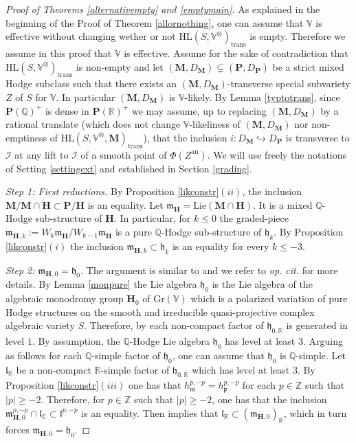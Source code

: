 \documentclass[10pt]{article}
\numberwithin{equation}{subsection}
\theoremstyle{plain}
\theoremstyle{definition}
\theoremstyle{remark}
\newcommand{\lie}{\mathrm{Lie}}
\newcommand{\I}{\mathscr{I}}
\newcommand{\Z}{\mathbb Z}
\newcommand{\Q}{\mathbb Q}
\newcommand{\C}{\mathbb C}
\newcommand{\R}{\mathbb R}
\newcommand{\V}{\mathbb V}
\newcommand{\pp}{\mathbf P}
\newcommand{\mon}{\mathbf H}
\newcommand{\M}{\mathbf M}
\newcommand{\HL}{\mathrm{HL}(S, \V^\otimes)}
\newcommand{\HLM}{\mathrm{HL}(S, \V^\otimes, \M)}
\newcommand{\an}{\mathrm{an}}
\newcommand{\gr}{\mathrm{Gr}}
\newcommand{\para}{\mathfrak{p}}
\newcommand{\mt}{\mathfrak{m}}
\newcommand{\ort}{\mathfrak{h}}
\newcommand{\trans}{\mathrm{trans}}
\newcommand{\ortl}{\mathfrak{l}}
\begin{document}
\begin{proof}[Proof of Theorems \ref{alternativempty} and \ref{emptymain}]
As explained in the beginning of the Proof of Theorem \ref{allornothing}, one can assume that $\V$ is effective without changing wether or not $\HL_\trans$ is empty. Therefore we assume in this proof that $\V$ is effective. Assume for the sake of contradiction that $\HL_\trans$ is non-empty and let $(\M, D_\M) \subsetneq (\pp, D_\pp)$ be a strict mixed Hodge subclass such that there exists an $(\M, D_\M)$-transverse special subvariety $Z$ of $S$ for $\V$. In particular $(\M, D_\M)$ is $\V$-likely. By Lemma \ref{typtotrans}, since $\pp(\Q)^+$ is dense in $\pp(\R)^+$ we may assume, up to replacing $(\M,D_\M)$ by a rational translate (which does not change $\V$-likeliness of $(\M,D_\M)$ nor non-emptiness of $\HLM_\trans$), that the inclusion $i : D_\M \hookrightarrow D_\pp$ is transverse to $\I$ at any lift to $\I$ of a smooth point of $\Phi(Z^\an)$. We will use freely the notations of Setting \ref{settingext} and established in Section \ref{grading}. 

\textit{Step 1: First reductions.} By Proposition \ref{likconstr}$(ii)$, the inclusion $\M/ \M \cap \mon \subset \pp/\mon$ is an equality. Let $\mt_\mon = \lie(\M \cap \mon)$. It is a mixed $\Q$-Hodge sub-structure of $\mon$. In particular, for $k \leqslant 0$ the graded-piece $\mt_{\mon,k} := W_k \mt_\mon/ W_{k-1} \mt_\mon$ is a pure $\Q$-Hodge sub-structure of $\ort_k$. By Proposition \ref{likconstr}$(i)$ the inclusion $\mt_{\mon,k} \subset \ort_k$ is an equality for every $k \leqslant -3$.

\textit{Step 2: $\mt_{\mon,0} = \ort_0$.} The argument is similar to \cite[Proof of Theorem 7.1]{bku} and we refer to \textit{op. cit.} for more details. By Lemma \ref{monpure} the Lie algebra $\ort_0$ is the Lie algebra of the algebraic monodromy group $\mon_0$ of $\gr(\V)$ which is a polarized variation of pure Hodge structures on the smooth and irreducible quasi-projective complex algebraic variety $S$. Therefore, by \cite[Prop. 7.4]{bku} each non-compact factor of $\ort_{0,\R}$ is generated in level $1$. By assumption, the $\Q$-Hodge Lie algebra $\ort_0$ has level at least $3$. Arguing as follows for each $\Q$-simple factor of $\ort_0$, one can assume that $\ort_0$ is $\Q$-simple. Let $\ortl_\R$ be a non-compact $\R$-simple factor of $\ort_{0,\R}$ which has level at least $3$. By Proposition \ref{likconstr}$(iii)$ one has that $h_\mt^{p,-p} = h_\para^{p,-p}$ for each $p \in \Z$ such that $|p| \geqslant -2$. Therefore, for $p \in \Z$ such that $|p| \geqslant -2$, one has that the inclusion $\mt_{\mon,0}^{p,-p} \cap \ortl_\C \subset \ortl^{p,-p}$ is an equality. Then \cite[Prop. 7.5]{bku} implies that $\ortl_\R \subset (\mt_{\mon,0})_\R$, which in turn forces $\mt_{\mon, 0} = \ort_0$.


\end{proof}
\end{document}
